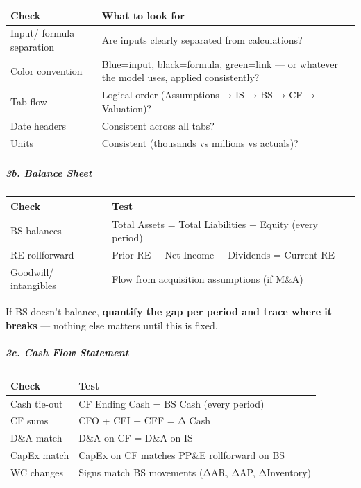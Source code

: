 \documentclass[11pt]{article}
\begin{document}
\begingroup
\small
\setlength{\tabcolsep}{2pt}
\begin{longtable}{>{\RaggedRight\arraybackslash\hspace{0pt}}p{}>{\RaggedRight\arraybackslash\hspace{0pt}}p{}}
\toprule
{} \textbf{Check} & \textbf{What to look for} \\
\midrule
{} Input/ formula separation & Are inputs clearly separated from calculations? \\
{} Color convention & Blue=input, black=formula, green=link — or whatever the model uses, applied consistently? \\
{} Tab flow & Logical order (Assumptions → IS → BS → CF → Valuation)? \\
{} Date headers & Consistent across all tabs? \\
{} Units & Consistent (thousands vs millions vs actuals)? \\
\bottomrule
\end{longtable}
\endgroup

\subparagraph{3b. Balance Sheet}\mbox{}\par

\begingroup
\small
\setlength{\tabcolsep}{2pt}
\begin{longtable}{>{\RaggedRight\arraybackslash\hspace{0pt}}p{}>{\RaggedRight\arraybackslash\hspace{0pt}}p{}}
\toprule
{} \textbf{Check} & \textbf{Test} \\
\midrule
{} BS balances & Total Assets = Total Liabilities + Equity (every period) \\
{} RE rollforward & Prior RE + Net Income − Dividends = Current RE \\
{} Goodwill/ intangibles & Flow from acquisition assumptions (if M\&A) \\
\bottomrule
\end{longtable}
\endgroup

If BS doesn't balance, \textbf{quantify the gap per period and trace where it breaks} — nothing else matters until this is fixed.


\subparagraph{3c. Cash Flow Statement}\mbox{}\par

\begingroup
\small
\setlength{\tabcolsep}{2pt}
\begin{longtable}{>{\RaggedRight\arraybackslash\hspace{0pt}}p{}>{\RaggedRight\arraybackslash\hspace{0pt}}p{}}
\toprule
{} \textbf{Check} & \textbf{Test} \\
\midrule
{} Cash tie-out & CF Ending Cash = BS Cash (every period) \\
{} CF sums & CFO + CFI + CFF = Δ Cash \\
{} D\&A match & D\&A on CF = D\&A on IS \\
{} CapEx match & CapEx on CF matches PP\&E rollforward on BS \\
{} WC changes & Signs match BS movements (ΔAR, ΔAP, ΔInventory) \\
\bottomrule
\end{longtable}
\endgroup
\end{document}
